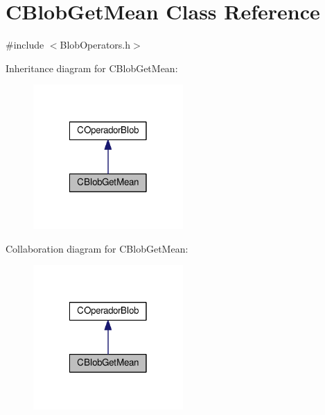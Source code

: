 \hypertarget{classCBlobGetMean}{\section{C\-Blob\-Get\-Mean Class Reference}
\label{classCBlobGetMean}
}


{\ttfamily \#include $<$Blob\-Operators.\-h$>$}



Inheritance diagram for C\-Blob\-Get\-Mean\-:\nopagebreak
\begin{figure}[H]
\begin{center}
\leavevmode
\includegraphics[width=162pt]{classCBlobGetMean__inherit__graph}
\end{center}
\end{figure}


Collaboration diagram for C\-Blob\-Get\-Mean\-:\nopagebreak
\begin{figure}[H]
\begin{center}
\leavevmode
\includegraphics[width=162pt]{classCBlobGetMean__coll__graph}
\end{center}
\end{figure}
